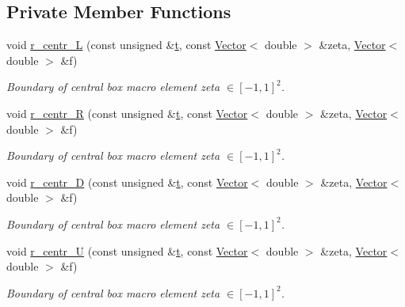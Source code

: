 \subsection*{Private Member Functions}
\begin{DoxyCompactItemize}
\item 
void \hyperlink{classoomph_1_1EighthSphereDomain_adc5634bf44b0689994ad68daf203e11f}{r\+\_\+centr\+\_\+L} (const unsigned \&\hyperlink{cfortran_8h_af6f0bd3dc13317f895c91323c25c2b8f}{t}, const \hyperlink{classoomph_1_1Vector}{Vector}$<$ double $>$ \&zeta, \hyperlink{classoomph_1_1Vector}{Vector}$<$ double $>$ \&f)
\begin{DoxyCompactList}\small\item\em Boundary of central box macro element zeta $ \in [-1,1]^2 $. \end{DoxyCompactList}\item 
void \hyperlink{classoomph_1_1EighthSphereDomain_a226c7c3bbcc59aa73c1033af523ef653}{r\+\_\+centr\+\_\+R} (const unsigned \&\hyperlink{cfortran_8h_af6f0bd3dc13317f895c91323c25c2b8f}{t}, const \hyperlink{classoomph_1_1Vector}{Vector}$<$ double $>$ \&zeta, \hyperlink{classoomph_1_1Vector}{Vector}$<$ double $>$ \&f)
\begin{DoxyCompactList}\small\item\em Boundary of central box macro element zeta $ \in [-1,1]^2 $. \end{DoxyCompactList}\item 
void \hyperlink{classoomph_1_1EighthSphereDomain_aa7c38e9c33934b556f59c044654500ce}{r\+\_\+centr\+\_\+D} (const unsigned \&\hyperlink{cfortran_8h_af6f0bd3dc13317f895c91323c25c2b8f}{t}, const \hyperlink{classoomph_1_1Vector}{Vector}$<$ double $>$ \&zeta, \hyperlink{classoomph_1_1Vector}{Vector}$<$ double $>$ \&f)
\begin{DoxyCompactList}\small\item\em Boundary of central box macro element zeta $ \in [-1,1]^2 $. \end{DoxyCompactList}\item 
void \hyperlink{classoomph_1_1EighthSphereDomain_afda0d6220482758cc0ad81ea848de45b}{r\+\_\+centr\+\_\+U} (const unsigned \&\hyperlink{cfortran_8h_af6f0bd3dc13317f895c91323c25c2b8f}{t}, const \hyperlink{classoomph_1_1Vector}{Vector}$<$ double $>$ \&zeta, \hyperlink{classoomph_1_1Vector}{Vector}$<$ double $>$ \&f)
\begin{DoxyCompactList}\small\item\em Boundary of central box macro element zeta $ \in [-1,1]^2 $. \end{DoxyCompactList}\item 

\end{DoxyCompactItemize}
